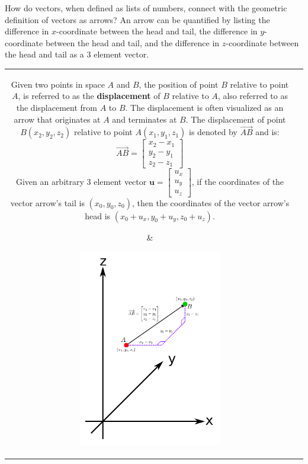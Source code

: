 \documentclass{article}
\begin{document}
How do vectors, when defined as lists of numbers, connect with the geometric definition of vectors as arrows? An arrow can be quantified by listing the difference in \(x\)-coordinate between the head and tail, the difference in \(y\)-coordinate between the head and tail, and the difference in \(z\)-coordinate between the head and tail as a \(3\) element vector. 

\begin{tabular}{cc}
\parbox{0.5\textwidth}{
Given two points in space \(A\) and \(B\), the position of point \(B\) relative to point \(A\), is referred to as the {\bf displacement} of \(B\) relative to \(A\), also referred to as the displacement from \(A\) to \(B\). The displacement is often visualized as an arrow that originates at \(A\) and terminates at \(B\). The displacement of point \(B(x_2, y_2, z_2)\) relative to point \(A(x_1, y_1, z_1)\) is denoted by \(\overrightarrow{AB}\) and is:
\[\overrightarrow{AB} = \begin{bmatrix} x_2 - x_1 \\ y_2 - y_1 \\ z_2 - z_1 \end{bmatrix}\]
Given an arbitrary \(3\) element vector \(\mathbf{u} = \begin{bmatrix} u_x \\ u_y \\ u_z \end{bmatrix}\), if the coordinates of the vector arrow's tail is \((x_0, y_0, z_0)\), then the coordinates of the vector arrow's head is \((x_0 + u_x, y_0 + u_y, z_0 + u_z)\).
} & \parbox{0.5\textwidth}{
\includegraphics[width = 0.5\textwidth]{displacement_vector}
}
\end{tabular}
\end{document}
